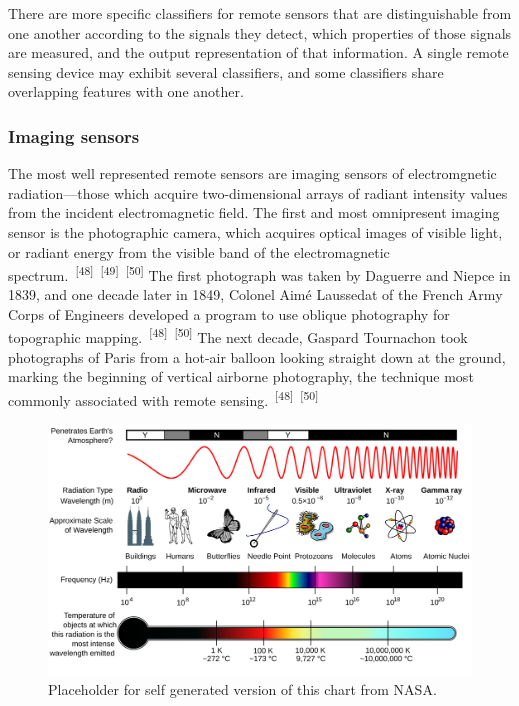 \documentclass{article}
\begin{document}
\par{There are more specific classifiers for remote sensors that are distinguishable from one another according to the signals they detect, which properties of those signals are measured, and the output representation of that information. A single remote sensing device may exhibit several classifiers, and some classifiers share overlapping features with one another.}

\subsubsection{Imaging sensors}


\par{The most well represented remote sensors are imaging sensors of electromgnetic radiation---those which acquire two-dimensional arrays of radiant intensity values from the incident electromagnetic field. The first and most omnipresent imaging sensor is the photographic camera, which acquires optical images of visible light, or radiant energy from the visible band of the electromagnetic spectrum.~\textsuperscript{[48]}~\textsuperscript{[49]}~\textsuperscript{[50]} The first photograph was taken by Daguerre and Niepce in 1839, and one decade later in 1849, Colonel Aimé Laussedat of the French Army Corps of Engineers developed a program to use oblique photography for topographic mapping.~\textsuperscript{[48]}~\textsuperscript{[50]}  The next decade, Gaspard Tournachon took photographs of Paris from a hot-air balloon looking straight down at the ground, marking the beginning of vertical airborne photography, the technique most commonly associated with remote sensing.~\textsuperscript{[48]}~\textsuperscript{[50]}}


\begin{figure}
    \centering
    \includegraphics[width=1\linewidth]{images/em-spectrum.png}
    \caption{Placeholder for self generated version of this chart from NASA.}
    \label{figure12}
\end{figure}
\end{document}
